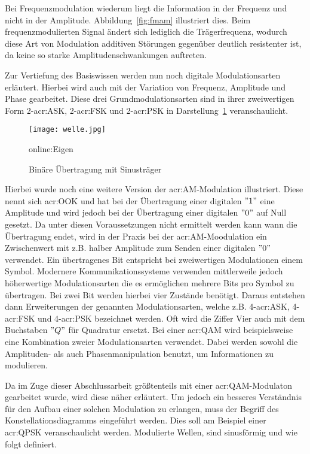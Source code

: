 Bei Frequenzmodulation wiederum liegt die Information in der Frequenz und nicht in der Amplitude. Abbildung~\ref{fig:fmam} illustriert dies. Beim frequenzmodulierten Signal ändert sich lediglich die Trägerfrequenz, wodurch diese Art von Modulation additiven Störungen gegenüber deutlich resistenter ist, da keine so starke Amplitudenschwankungen auftreten.\cite{hoeher}


Zur Vertiefung des Basiswissen werden nun noch digitale Modulationsarten erläutert. Hierbei wird auch mit der Variation von Frequenz, Amplitude und Phase gearbeitet. Diese drei Grundmodulationsarten sind in ihrer zweiwertigen Form 2-\gls{acr:ASK}, 2-\gls{acr:FSK} und 2-\gls{acr:PSK} in Darstellung~\ref{fig:welle} veranschaulicht.

\begin{figure}[H]
	\centering
	\texttt{[image: welle.jpg]}
	\caption[Binäre Übertragung mit Sinusträger]{Binäre Übertragung mit Sinusträger} 
	\cite{wernerNachrichtentechnikEinfuehrungFuer2010}\gls{online:Eigen}
	\label{fig:welle}
\end{figure}

Hierbei wurde noch eine weitere Version der \gls{acr:AM}-Modulation illustriert. Diese nennt sich \gls{acr:OOK} und hat bei der Übertragung einer digitalen $"1"$ eine Amplitude und wird jedoch bei der Übertragung einer digitalen $"0"$ auf Null gesetzt. Da unter diesen Voraussetzungen nicht ermittelt werden kann wann die Übertragung endet, wird in der Praxis bei der \gls{acr:AM}-Moodulation ein Zwischenwert mit z.B. halber Amplitude zum Senden einer digitalen $"0"$ verwendet. Ein übertragenes Bit entspricht bei zweiwertigen Modulationen einem Symbol. Modernere Kommunikationssysteme verwenden mittlerweile jedoch höherwertige Modulationsarten die es ermöglichen mehrere Bits pro Symbol zu übertragen. Bei zwei Bit werden hierbei vier Zustände benötigt. Daraus entstehen dann Erweiterungen der genannten Modulationsarten, welche z.B. 4-\gls{acr:ASK}, 4-\gls{acr:FSK} und 4-\gls{acr:PSK} bezeichnet werden. Oft wird die Ziffer Vier auch mit dem Buchstaben $"Q"$ für Quadratur ersetzt.\cite{howwireless}\cite{butlerWirelessNetworkingDeveloping2013} Bei einer \gls{acr:QAM} wird beispielsweise eine Kombination zweier Modulationsarten verwendet. Dabei werden sowohl die Amplituden- als auch Phasenmanipulation benutzt, um Informationen zu modulieren. 

Da im Zuge dieser Abschlussarbeit größtenteils mit einer \gls{acr:QAM}-Modulaton gearbeitet wurde, wird diese näher erläutert. Um jedoch ein besseres Verständnis für den Aufbau einer solchen Modulation zu erlangen, muss der Begriff des Konstellationsdiagramms eingeführt werden. Dies soll am Beispiel einer \gls{acr:QPSK} veranschaulicht werden. Modulierte Wellen, sind sinusförmig und wie folgt definiert. 

